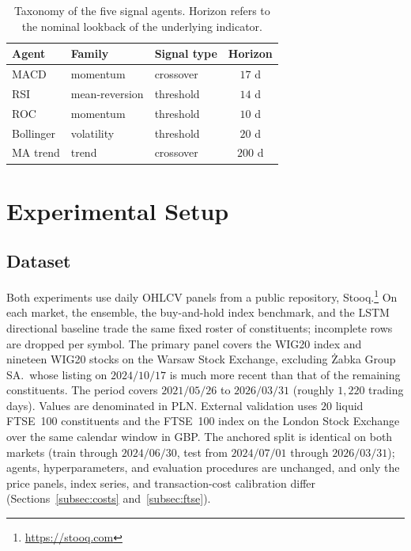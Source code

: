 \documentclass{ieeeaccess}
\newcommand{\FtseNsymbols}{\ensuremath{20}}
\begin{document}
\begin{table}[t]
\centering
\caption{Taxonomy of the five signal agents. Horizon refers to the nominal lookback of the underlying indicator.}
\label{tab:taxonomy}
\begin{tabular}{lllc}
\toprule
Agent & Family & Signal type & Horizon \\
\midrule
MACD          & momentum       & crossover & $17$ d \\
RSI           & mean-reversion & threshold & $14$ d \\
ROC           & momentum       & threshold & $10$ d \\
Bollinger     & volatility     & threshold & $20$ d \\
MA trend      & trend          & crossover & $200$ d \\
\bottomrule
\end{tabular}
\end{table}

\section{Experimental Setup}
\label{sec:setup}

\subsection{Dataset}
\label{subsec:dataset}

Both experiments use daily OHLCV panels from a public repository, Stooq.\footnote{\url{https://stooq.com}} On each market, the ensemble, the buy-and-hold index benchmark, and the LSTM directional baseline trade the same fixed roster of constituents; incomplete rows are dropped per symbol. The primary panel covers the WIG20 index and nineteen WIG20 stocks on the Warsaw Stock Exchange, excluding \.{Z}abka Group SA.\, whose listing on $2024/10/17$ is much more recent than that of the remaining constituents. The period covers $2021/05/26$ to $2026/03/31$ (roughly $1{,}220$ trading days). Values are denominated in PLN. External validation uses \FtseNsymbols{} liquid FTSE~100 constituents and the FTSE~100 index on the London Stock Exchange over the same calendar window in GBP. The anchored split is identical on both markets (train through $2024/06/30$, test from $2024/07/01$ through $2026/03/31$); agents, hyperparameters, and evaluation procedures are unchanged, and only the price panels, index series, and transaction-cost calibration differ (Sections~\ref{subsec:costs} and~\ref{subsec:ftse}).
\end{document}
